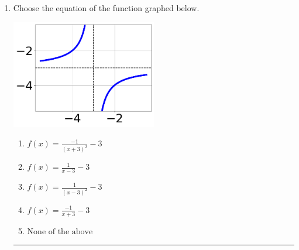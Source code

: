 \documentclass[14pt]{extbook}
\newcommand{\litem}[1]{\item#1\hspace*{-1cm}\rule{\textwidth}{0.4pt}}
\begin{document}
\begin{enumerate}
{\begin{enumerate}[label=\Alph*.]
\end{enumerate} }
\litem{
Choose the equation of the function graphed below.
\begin{center}
    \includegraphics[width=0.5\textwidth]{../Figures/rationalGraphToEquationC.png}
\end{center}
\begin{enumerate}[label=\Alph*.]
\item \( f(x) = \frac{-1}{(x + 3)^2} - 3 \)
\item \( f(x) = \frac{1}{x - 3} - 3 \)
\item \( f(x) = \frac{1}{(x - 3)^2} - 3 \)
\item \( f(x) = \frac{-1}{x + 3} - 3 \)
\item \( \text{None of the above} \)


\end{enumerate}}
\end{enumerate}
\end{document}

